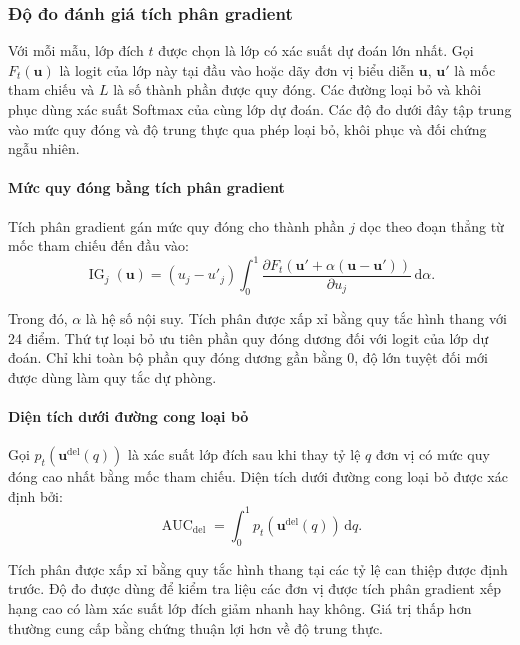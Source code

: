 \subsubsection{Độ đo đánh giá tích phân gradient}

Với mỗi mẫu, lớp đích $t$ được chọn là lớp có xác suất dự đoán lớn nhất. Gọi $F_t(\boldsymbol{u})$ là logit của lớp này tại đầu vào hoặc dãy đơn vị biểu diễn $\boldsymbol{u}$, $\boldsymbol{u}'$ là mốc tham chiếu và $L$ là số thành phần được quy đóng. Các đường loại bỏ và khôi phục dùng xác suất Softmax của cùng lớp dự đoán. Các độ đo dưới đây tập trung vào mức quy đóng và độ trung thực qua phép loại bỏ, khôi phục và đối chứng ngẫu nhiên.

\paragraph{Mức quy đóng bằng tích phân gradient}

Tích phân gradient \cite{Sundararajan2017IntegratedGradients} gán mức quy đóng cho thành phần $j$ dọc theo đoạn thẳng từ mốc tham chiếu đến đầu vào:
\begin{equation}
\operatorname{IG}_j(\boldsymbol{u})=(u_j-u'_j)
\int_{0}^{1}\frac{\partial F_t\!\left(
\boldsymbol{u}'+\alpha(\boldsymbol{u}-\boldsymbol{u}')\right)}
{\partial u_j}\,\mathrm{d}\alpha.
\label{eq:ch4_integrated_gradients}
\end{equation}

Trong đó, $\alpha$ là hệ số nội suy. Tích phân được xấp xỉ bằng quy tắc hình thang với 24 điểm. Thứ tự loại bỏ ưu tiên phần quy đóng dương đối với logit của lớp dự đoán. Chỉ khi toàn bộ phần quy đóng dương gần bằng 0, độ lớn tuyệt đối mới được dùng làm quy tắc dự phòng.

\paragraph{Diện tích dưới đường cong loại bỏ}

Gọi $p_t(\boldsymbol{u}^{\mathrm{del}}(q))$ là xác suất lớp đích sau khi thay tỷ lệ $q$ đơn vị có mức quy đóng cao nhất bằng mốc tham chiếu. Diện tích dưới đường cong loại bỏ được xác định bởi:
\begin{equation}
\operatorname{AUC}_{\mathrm{del}}=
\int_{0}^{1}p_t\!\left(\boldsymbol{u}^{\mathrm{del}}(q)\right)\,\mathrm{d}q.
\label{eq:ch4_deletion_auc}
\end{equation}

Tích phân được xấp xỉ bằng quy tắc hình thang tại các tỷ lệ can thiệp được định trước. Độ đo được dùng để kiểm tra liệu các đơn vị được tích phân gradient xếp hạng cao có làm xác suất lớp đích giảm nhanh hay không. Giá trị thấp hơn thường cung cấp bằng chứng thuận lợi hơn về độ trung thực.

